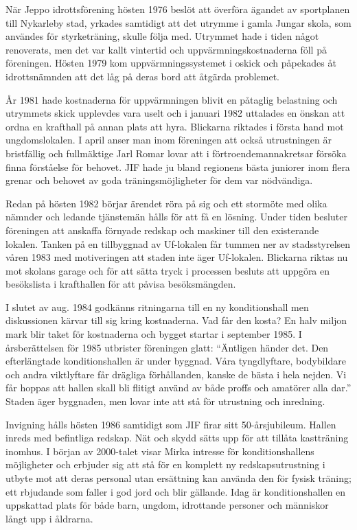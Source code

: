 


När Jeppo idrottsförening hösten 1976 beslöt att överföra ägandet av sportplanen till Nykarleby stad, yrkades samtidigt att det utrymme i gamla Jungar skola, som användes för styrketräning, skulle följa med. Utrymmet hade i tiden något renoverats, men det var kallt vintertid och uppvärmningskostnaderna föll på föreningen. Hösten 1979 kom uppvärmningssystemet i oskick och påpekades åt idrottsnämnden att det låg på deras bord att åtgärda problemet.

År 1981 hade kostnaderna för uppvärmningen blivit en påtaglig belastning och utrymmets skick upplevdes vara uselt och i januari 1982 uttalades en önskan att ordna en krafthall på annan plats att hyra. Blickarna riktades i första hand mot ungdomslokalen. I april anser man inom föreningen att också utrustningen är bristfällig och fullmäktige Jarl Romar lovar att i förtroendemannakretsar försöka finna förståelse för behovet. JIF hade ju bland regionens bästa juniorer inom flera grenar och behovet av goda träningsmöjligheter för dem var nödvändiga.

Redan på hösten 1982 börjar ärendet röra på sig och ett stormöte med olika nämnder och ledande tjänstemän hålls för att få en lösning. Under tiden besluter föreningen att anskaffa förnyade redskap och maskiner till den existerande lokalen. Tanken på en tillbyggnad av Uf-lokalen får tummen ner av stadsstyrelsen våren 1983 med motiveringen att staden inte äger Uf-lokalen. Blickarna riktas nu mot skolans garage och för att sätta tryck i processen besluts att uppgöra en besökslista i krafthallen för att påvisa besöksmängden.

I slutet av aug. 1984 godkänns ritningarna till en ny konditionshall men diskussionen kärvar till sig kring kostnaderna. Vad får den kosta? En halv miljon mark blir taket för kostnaderna och bygget startar i september 1985. I årsberättelsen för 1985 utbrister föreningen glatt: ``Äntligen händer det. Den efterlängtade konditionshallen är under byggnad. Våra tyngdlyftare, bodybildare och andra viktlyftare får drägliga förhållanden, kanske de bästa i hela nejden. Vi får hoppas att hallen skall bli flitigt använd av både proffs och amatörer alla dar.'' Staden äger byggnaden, men lovar inte att stå för utrustning och inredning.

Invigning hålls hösten 1986 samtidigt som JIF firar sitt 50-årsjubileum. Hallen inreds med befintliga redskap. Nät och skydd sätts upp för att tillåta kastträning inomhus. I början av 2000-talet visar Mirka intresse för konditionshallens möjligheter och erbjuder sig att stå för en komplett ny redskapsutrustning i utbyte mot att deras personal utan ersättning kan använda den för fysisk träning; ett rbjudande som faller i god jord och blir gällande. Idag är konditionshallen en uppskattad plats för både barn, ungdom, idrottande personer och människor långt upp i åldrarna.



